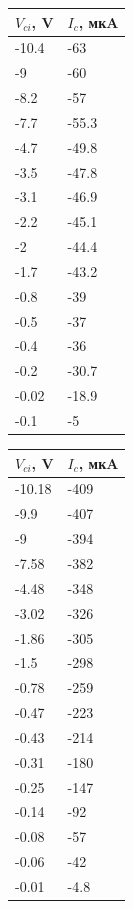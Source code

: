 \documentclass[a4paper,14pt]{article}
\begin{document}
\begin{table}[H]
	\begin{center}
		\begin{tabular}{|l|l|}
			\hline
			$V_{ci}$, V & $I_c$, мкA \\ \hline
			-10.4	&	-63 \\ \hline
			-9	&	-60 \\ \hline
			-8.2	&	-57 \\ \hline
			-7.7	&	-55.3 \\ \hline
			-4.7	&	-49.8 \\ \hline
			-3.5	&	-47.8 \\ \hline
			-3.1	&	-46.9 \\ \hline
			-2.2	&	-45.1 \\ \hline
			-2	&	-44.4 \\ \hline
			-1.7	&	-43.2 \\ \hline
			-0.8	&	-39 \\ \hline
			-0.5	&	-37 \\ \hline
			-0.4	&	-36 \\ \hline
			-0.2	&	-30.7 \\ \hline
			-0.02	&	-18.9 \\ \hline
			-0.1	&	-5 \\ \hline
		\end{tabular}
	\end{center}
\end{table}

\begin{table}[H]
	\begin{center}
		\begin{tabular}{|l|l|}
			\hline
			$V_{ci}$, V & $I_c$, мкA \\ \hline
			-10.18	&	-409 \\ \hline
			-9.9	&	-407 \\ \hline
			-9	&	-394 \\ \hline
			-7.58	&	-382 \\ \hline
			-4.48	&	-348 \\ \hline
			-3.02	&	-326 \\ \hline
			-1.86	&	-305 \\ \hline
			-1.5	&	-298 \\ \hline
			-0.78	&	-259 \\ \hline
			-0.47	&	-223 \\ \hline
			-0.43	&	-214 \\ \hline
			-0.31	&	-180 \\ \hline
			-0.25	&	-147 \\ \hline
			-0.14	&	-92 \\ \hline
			-0.08	&	-57 \\ \hline
			-0.06	&	-42 \\ \hline
			-0.01	&	-4.8 \\ \hline
		\end{tabular}
	\end{center}
\end{table}
\end{document}

